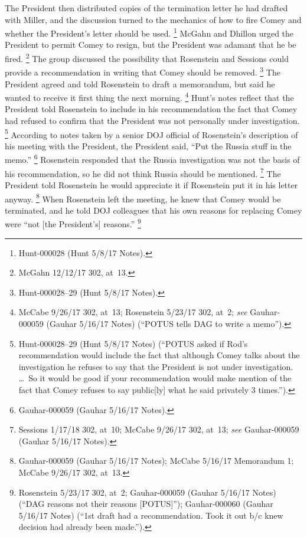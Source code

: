 The President then distributed copies of the termination letter he had drafted with Miller, and the discussion turned to the mechanics of how to fire Comey and whether the President's letter should be used.%
\footnote{Hunt-000028 (Hunt 5/8/17 Notes).}
McGahn and Dhillon urged the President to permit Comey to resign, but the President was adamant that he be fired.%
\footnote{McGahn 12/12/17 302, at~13.}
The group discussed the possibility that Rosenstein and Sessions could provide a recommendation in writing that Comey should be removed.%
\footnote{Hunt-000028--29 (Hunt 5/8/17 Notes).}
The President agreed and told Rosenstein to draft a memorandum, but said he wanted to receive it first thing the next morning.%
\footnote{McCabe 9/26/17 302, at~13;
Rosenstein 5/23/17 302, at~2;
\textit{see} Gauhar-000059 (Gauhar 5/16/17 Notes) (``POTUS tells DAG to write a memo'').}
Hunt's notes reflect that the President told Rosenstein to include in his recommendation the fact that Comey had refused to confirm that the President was not personally under investigation.%
\footnote{Hunt-000028--29 (Hunt 5/8/17 Notes) (``POTUS asked if Rod's recommendation would include the fact that although Comey talks about the investigation he refuses to say that the President is not under investigation.
\dots~So it would be good if your recommendation would make mention of the fact that Comey refuses to say public[ly] what he said privately 3 times.'').}
According to notes taken by a senior DOJ official of Rosenstein's description of his meeting with the President, the President said, ``Put the Russia stuff in the memo.''%
\footnote{Gauhar-000059 (Gauhar 5/16/17 Notes).}
Rosenstein responded that the Russia investigation was not the basis of his recommendation, so he did not think Russia should be mentioned.%
\footnote{Sessions 1/17/18 302, at~10;
McCabe 9/26/17 302, at~13;
\textit{see} Gauhar-000059 (Gauhar 5/16/17 Notes).}
The President told Rosenstein he would appreciate it if Rosenstein put it in his letter anyway.%
\footnote{Gauhar-000059 (Gauhar 5/16/17 Notes);
McCabe 5/16/17 Memorandum 1;
McCabe 9/26/17 302, at~13.}
When Rosenstein left the meeting, he knew that Comey would be terminated, and he told DOJ colleagues that his own reasons for replacing Comey were ``not [the President's] reasons.''%
\footnote{Rosenstein 5/23/17 302, at~2;
Gauhar-000059 (Gauhar 5/16/17 Notes) (``DAG reasons not their reasons [POTUS]'');
Gauhar-000060 (Gauhar 5/16/17 Notes) (``1st draft had a recommendation.
Took it out b/c knew decision had already been made.'').}

